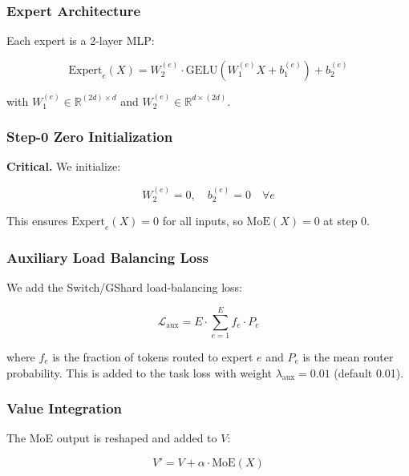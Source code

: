 \subsubsection{Expert Architecture}

Each expert is a 2-layer MLP:

\begin{equation}
\text{Expert}_e(X) = W_2^{(e)} \cdot \text{GELU}(W_1^{(e)} X + b_1^{(e)}) + b_2^{(e)}
\end{equation}

with $W_1^{(e)} \in \mathbb{R}^{(2d) \times d}$ and 
$W_2^{(e)} \in \mathbb{R}^{d \times (2d)}$.

\subsubsection{Step-0 Zero Initialization}

\textbf{Critical.} We initialize:

\begin{equation}
W_2^{(e)} = 0, \quad b_2^{(e)} = 0 \quad \forall e
\end{equation}

This ensures $\text{Expert}_e(X) = 0$ for all inputs, so 
$\text{MoE}(X) = 0$ at step 0.

\subsubsection{Auxiliary Load Balancing Loss}

We add the Switch/GShard load-balancing loss:

\begin{equation}
\mathcal{L}_\text{aux} = E \cdot \sum_{e=1}^{E} f_e \cdot P_e
\end{equation}

where $f_e$ is the fraction of tokens routed to expert $e$ and $P_e$ is 
the mean router probability. This is added to the task loss with weight 
$\lambda_\text{aux} = 0.01$ (default 0.01).

\subsubsection{Value Integration}

The MoE output is reshaped and added to $V$:

\begin{equation}
V' = V + \alpha \cdot \text{MoE}(X)
\end{equation}

